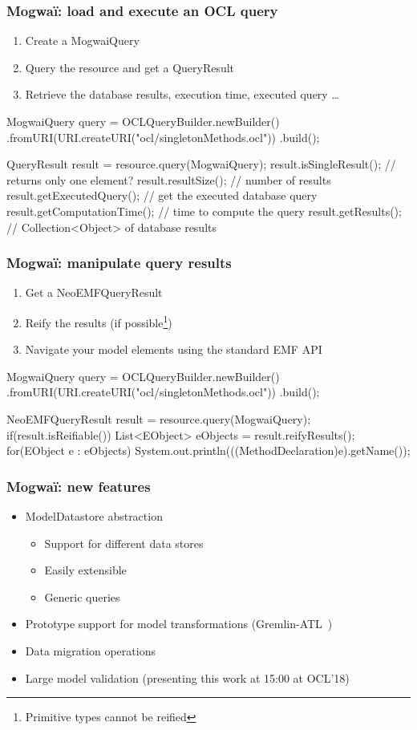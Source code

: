 \begin{frame}[fragile]\frametitle{Mogwa\"i: load and execute an OCL query}
\begin{enumerate}
\item Create a MogwaiQuery
\item Query the resource and get a QueryResult
\item Retrieve the database results, execution time, executed query \ldots
\end{enumerate}
\begin{java}
MogwaiQuery query = OCLQueryBuilder.newBuilder()
	.fromURI(URI.createURI("ocl/singletonMethods.ocl"))
	.build();
	
QueryResult result = resource.query(MogwaiQuery);
result.isSingleResult(); // returns only one element?
result.resultSize(); // number of results
result.getExecutedQuery(); // get the executed database query
result.getComputationTime(); // time to compute the query
result.getResults(); // Collection<Object> of database results
\end{java}
\end{frame}

\begin{frame}[fragile]\frametitle{Mogwa\"i: manipulate query results}
\begin{enumerate}
\item Get a NeoEMFQueryResult
\item Reify the results (if possible\footnote{Primitive types cannot be reified})
\item Navigate your model elements using the standard EMF API
\end{enumerate}
\begin{java}
MogwaiQuery query = OCLQueryBuilder.newBuilder()
	.fromURI(URI.createURI("ocl/singletonMethods.ocl"))
	.build();
	
NeoEMFQueryResult result = resource.query(MogwaiQuery);
if(result.isReifiable()) {
	List<EObject> eObjects = result.reifyResults();
	for(EObject e : eObjects) {
		System.out.println(((MethodDeclaration)e).getName());
	}
}
\end{java}
\end{frame}

\begin{frame}[c]\frametitle{Mogwa\"i: new features}
\begin{itemize}
	\item ModelDatastore abstraction
		\begin{itemize}
		\item Support for different data stores
		\item Easily extensible
		\item Generic queries
		\end{itemize}
	\item Prototype support for model transformations (Gremlin-ATL~\cite{daniel2017gremlin})
	\item Data migration operations
	\item Large model validation (presenting this work at 15:00 at OCL'18)
\end{itemize}

\end{frame}



